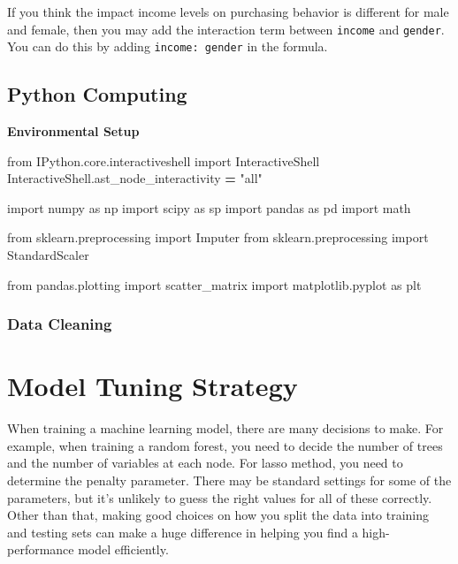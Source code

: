 \documentclass[12pt,]{krantz}
\newenvironment{Shaded}{\begin{snugshade}}{\end{snugshade}}
\newcommand{\StringTok}[1]{\textcolor[rgb]{0.31,0.60,0.02}{{#1}}}
\newcommand{\ImportTok}[1]{{#1}}
\newcommand{\OperatorTok}[1]{\textcolor[rgb]{0.81,0.36,0.00}{\textbf{{#1}}}}
\newcommand{\NormalTok}[1]{{#1}}
\theoremstyle{definition}
\theoremstyle{definition}
\theoremstyle{remark}
\begin{document}
If you think the impact income levels on purchasing behavior is
different for male and female, then you may add the interaction term
between \texttt{income} and \texttt{gender}. You can do this by adding
\texttt{income:\ gender} in the formula.

\section{Python Computing}\label{python-computing}

\textbf{Environmental Setup}

\begin{Shaded}
\begin{Highlighting}[]
\ImportTok{from} \NormalTok{IPython.core.interactiveshell }\ImportTok{import} \NormalTok{InteractiveShell}
\NormalTok{InteractiveShell.ast_node_interactivity }\OperatorTok{=} \StringTok{"all"}

\ImportTok{import} \NormalTok{numpy }\ImportTok{as} \NormalTok{np}
\ImportTok{import} \NormalTok{scipy }\ImportTok{as} \NormalTok{sp}
\ImportTok{import} \NormalTok{pandas }\ImportTok{as} \NormalTok{pd}
\ImportTok{import} \NormalTok{math}

\ImportTok{from} \NormalTok{sklearn.preprocessing }\ImportTok{import} \NormalTok{Imputer}
\ImportTok{from} \NormalTok{sklearn.preprocessing }\ImportTok{import} \NormalTok{StandardScaler}

\ImportTok{from} \NormalTok{pandas.plotting }\ImportTok{import} \NormalTok{scatter_matrix}
\ImportTok{import} \NormalTok{matplotlib.pyplot }\ImportTok{as} \NormalTok{plt}
\end{Highlighting}
\end{Shaded}

\subsection{Data Cleaning}\label{data-cleaning-1}

\chapter{Model Tuning Strategy}\label{model-tuning-strategy}

When training a machine learning model, there are many decisions to
make. For example, when training a random forest, you need to decide the
number of trees and the number of variables at each node. For lasso
method, you need to determine the penalty parameter. There may be
standard settings for some of the parameters, but it's unlikely to guess
the right values for all of these correctly. Other than that, making
good choices on how you split the data into training and testing sets
can make a huge difference in helping you find a high-performance model
efficiently.
\end{document}
